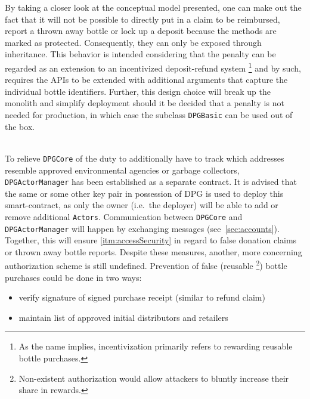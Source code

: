 \begin{description}[format={\storedescriptionlabel}]
	By taking a closer look at the conceptual model presented, one can make out the fact that it will not be possible to directly put in a claim to be reimbursed, report a thrown away bottle or lock up a deposit because the methods are marked as protected. Consequently, they can only be exposed through inheritance. This behavior is intended considering that the penalty can be regarded as an extension to an incentivized deposit-refund system \footnote{As the name implies, incentivization primarily refers to rewarding reusable bottle purchases.} and by such, requires the APIs to be extended with additional arguments that capture the individual bottle identifiers. Further, this design choice will break up the monolith and simplify deployment should it be decided that a penalty is not needed for production, in which case the subclass \texttt{DPGBasic} can be used out of the box.
	\item[Access Control]
	\hfill \\
	To relieve \texttt{DPGCore} of the duty to additionally have to track which addresses resemble approved environmental agencies or garbage collectors, \texttt{DPGActorManager} has been established as a separate contract. It is advised that the same or some other key pair in possession of \ac{DPG} is used to deploy this smart-contract, as only the owner (i.e.~the deployer) will be able to add or remove additional \texttt{Actors}. Communication between \texttt{DPGCore} and \texttt{DPGActorManager} will happen by exchanging messages (see~\ref{sec:accounts}). Together, this will ensure \ref{itm:accessSecurity} in regard to false donation claims or thrown away bottle reports. Despite these measures, another, more concerning authorization scheme is still undefined. Prevention of false (reusable \footnote{Non-existent authorization would allow attackers to bluntly increase their share in rewards.}) bottle purchases could be done in two ways:
	
	\begin{itemize}
  		\item verify signature of signed purchase receipt (similar to refund claim)
  		\item maintain list of approved initial distributors and retailers
	\end{itemize}


\end{description}
